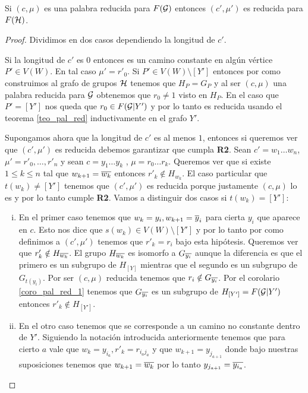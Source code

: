 \documentclass[tesis.tex]{subfiles}
\begin{document}
\begin{prop}\label{lema_pal_red_iso}
	Si $(c, \mu)$ es una palabra reducida para $F({\cal G})$ entonces $(c', \mu')$ es reducida para $F({\cal H})$.
\end{prop}
\begin{proof}
	Dividimos en dos casos dependiendo la longitud de $c'$.
	
	Si la longitud de $c'$ es  $0$ entonces es un camino constante en algún vértice $P' \in V(W)$. 
	En tal caso $\mu' = r'_0$.
	Si $P' \in V(W) \setminus [Y']$ entonces por como construimos al grafo de grupos $\cal H$ tenemos que $H_P = G_P$ y al ser $(c, \mu)$ una palabra reducida para ${\cal G}$ obtenemos que $r_0 \neq 1$ visto en $H_P$.
	En el caso que $P' = [Y']$ nos queda que $r_0 \in F({\cal G} | Y')$ y por lo tanto es reducida usando el teorema \ref{teo_pal_red} inductivamente en el grafo $Y'$.
	
	Supongamos ahora que la longitud de $c'$ es al menos $1$, entonces si queremos ver que  $(c',\mu')$ es reducida debemos garantizar que cumpla \textbf{R2}.
	Sean $c' = w_1 \dots w_{n}$, $\mu' = r'_0, \dots, r'_n$ y sean $c = y_{1} \dots y_{k}$ , $\mu = r_{0} \dots r_{k}$.
	Queremos ver que si existe $1 \le k \le n$ tal que  $w_{k+1} = \overline{w_k}$ entonces $r'_k \notin H_{w_k}$.		
	El caso particular que $t(w_k) \neq [Y']$ tenemos que $(c', \mu')$ es reducida porque justamente $(c, \mu)$ lo es y por lo tanto cumple \textbf{R2}.
	Vamos a distinguir dos casos si $t(w_k) = [Y']$:
	\begin{enumerate}[i)]
		\item En el primer caso tenemos que  $w_{k} = y_i, w_{k+1} = \overline y_i$ para cierta $y_i$ que aparece en $c$.
		Esto nos dice que $s(w_k) \in V(W) \setminus [Y']$ y por lo tanto por como definimos a $(c', \mu')$ tenemos que $r'_k = r_i$ bajo esta hipótesis.
		Queremos ver que $r'_k \notin H_{\overline{w_k}}$.
		El grupo $H_{\overline{w_k}}$ es isomorfo a $G_{\overline{y_i}}$ aunque la diferencia es que el primero es un subgrupo de $H_{[Y]}$ mientras que el segundo es un subgrupo de $G_{t(y_i)}$.
		Por ser $(c, \mu)$ reducida tenemos que $r_i \notin G_{\overline{y_i}}$.
		Por el corolario \ref{coro_pal_red_1} tenemos que $G_{\overline{y_i}}$ es un subgrupo de $H_{[Y']} = F({\cal G} | Y')$ entonces $r'_k \notin H_{[Y']}$.
		
		\item En el otro caso tenemos que se corresponde a un camino no constante dentro de $Y'$.
		Siguiendo la notación introducida anteriormente tenemos que para cierto $a$ vale que $w_k = y_{i_a}, r'_k = r_{i_aj_a}$ y que $w_{k+1} = y_{j_{a+1}}$ donde bajo nuestras suposiciones tenemos que $w_{k+1} = \overline{w_{k}}$ por lo tanto $ y_{j_{a+1}} = \overline{y_{i_a}}$.
		

\end{enumerate}
\end{proof}
\end{document}
